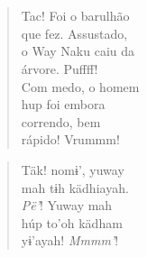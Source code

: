\chapter*{}

\mbox{}\vspace*{\fill}

\begin{verse}
Tac! Foi o barulhão\\
que fez. Assustado,\\
o Way Naku caiu da\\
árvore. Puffff!\\
Com medo, o homem\\
hup foi embora\\
correndo, bem\\
rápido! Vrummm!
\end{verse}

\begin{verse}
Täk! nomɨ’, yuway\\
mah tɨh kädhiayah.\\
\textit{Pë’}! Yuway mah\\
húp to’oh kädham\\
yɨ’ayah! \textit{Mmmm’}!
\end{verse}

\vspace*{\fill}

